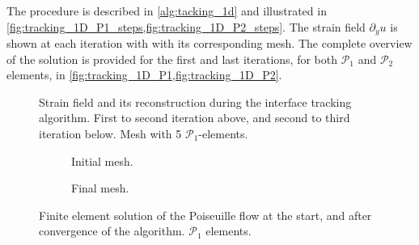 \documentclass[11 pt]{report}
\begin{document}
The procedure is described in \cref{alg:tacking_1d} and illustrated in \cref{fig:tracking_1D_P1_steps,fig:tracking_1D_P2_steps}. The strain field $\partial_y u$ is shown at each iteration with with its corresponding mesh. The complete overview of the solution is provided for the first and last iterations, for both $\mathcal{P}_1$ and $\mathcal{P}_2$ elements, in \cref{fig:tracking_1D_P1,fig:tracking_1D_P2}.




\begin{figure}[hb]
    \centering
    \begin{subfigure}[t]{\textwidth}
        
    \end{subfigure}
    \begin{subfigure}[t]{\textwidth}
        
    \end{subfigure}
    \caption{Strain field and its reconstruction during the interface tracking algorithm. First to second iteration above, and second to third iteration below. Mesh with 5 $\mathcal{P}_1$-elements.}
    \label{fig:tracking_1D_P1_steps}
\end{figure}

\begin{figure}[ht]
    \centering
    \begin{subfigure}[t]{\textwidth}
        
        \caption{Initial mesh.}
        \label{fig:tracking_1D_P1_a}
    \end{subfigure}
    \begin{subfigure}[t]{\textwidth}
        
        \caption{Final mesh.}
        \label{fig:tracking_1D_P1_b}
    \end{subfigure}
    \caption{Finite element solution of the Poiseuille flow at the start, and after convergence of the algorithm. $\mathcal{P}_1$ elements.}
    \label{fig:tracking_1D_P1}
\end{figure}
\end{document}
